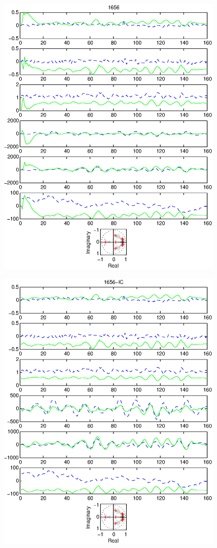 \documentclass{article}
\begin{document}
\begin{figure}[htb!]
\centering
\includegraphics{1656.eps}
\end{figure}\clearpage
\begin{figure}[htb!]
\centering
\includegraphics{1656_ic.eps}
\end{figure}\clearpage
\end{document}
